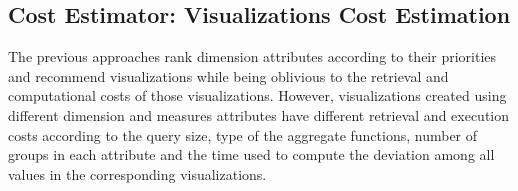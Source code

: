 \subsection{Cost Estimator: Visualizations Cost Estimation}
\label{sec:cost_est}
%
\begin{algorithm}[t]
\label{alg:viewsest}
\caption{$ViewsEstimate$}
\;
\end{algorithm}
%
The previous approaches rank dimension attributes according to their priorities 
and recommend visualizations while being oblivious to the retrieval and computational costs of those visualizations.
However, visualizations created using different dimension and measures attributes have different retrieval and execution costs 
according to the query size, type of the aggregate functions, number of groups in each attribute and 
the time used to compute the deviation among all values in the corresponding visualizations.
% 
%

